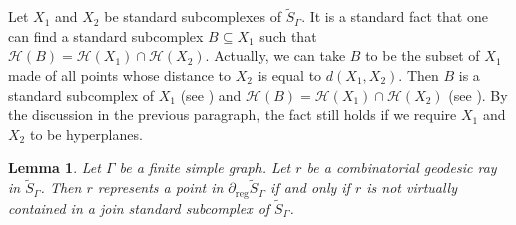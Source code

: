 \documentclass[JEP,XML,SOM,Unicode,NoFloatCountersInSection,published]{cedram}
\let\mathcal\mathscr
\theoremstyle{plain}
\newtheorem{lemma}[theo]{Lemma}
\theoremstyle{definition}
\newcommand{\calh}{\mathcal{H}}
\newcommand{\reg}{\mathrm{reg}}
\begin{document}
Let $X_1$ and $X_2$ be standard subcomplexes of $\widetilde{S}_\Gamma$. It is a standard fact that one can find a standard subcomplex $B\subseteq X_1$ such that $\calh(B)=\calh(X_1)\cap \calh(X_2)$. Actually, we can take $B$ to be the subset of $X_1$ made of all points whose distance to $X_2$ is equal to $d(X_1,X_2)$. Then $B$ is a standard subcomplex of $X_1$ (see \cite[Lem.\,3.1]{Hua}) and $\calh(B)=\calh(X_1)\cap \calh(X_2)$ (see \eg \cite[Lem.\,2.14]{Hua3}). By the discussion in the previous paragraph, the fact still holds if we require $X_1$ and $X_2$ to be hyperplanes.

\begin{lemma}\label{lem:join subgroup}
Let $\Gamma$ be a finite simple graph. Let $r$ be a combinatorial geodesic ray in $\widetilde{S}_\Gamma$. Then $r$ represents a point in $\partial_\reg\widetilde{S}_\Gamma$ if and only if $r$ is not virtually contained in a join standard subcomplex of $\widetilde{S}_\Gamma$.
\end{lemma}
\end{document}
